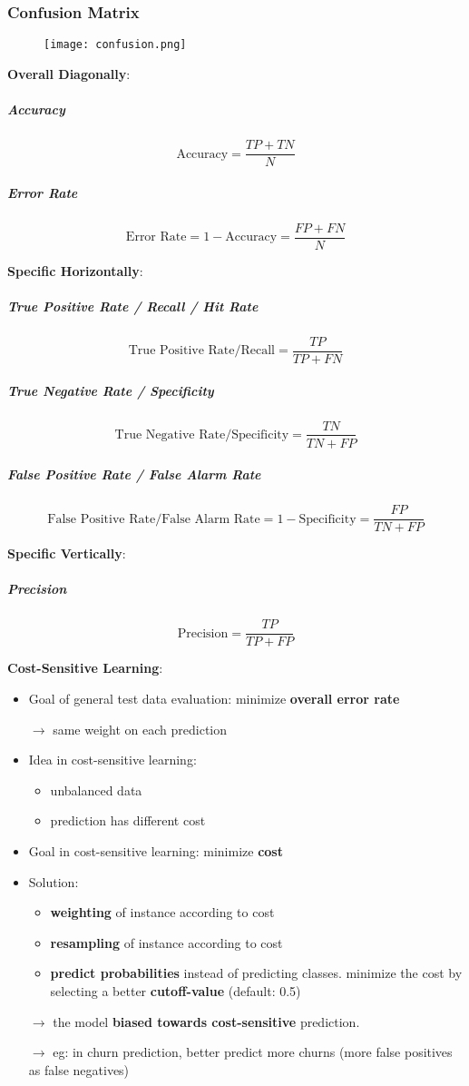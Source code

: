 \subsubsection{Confusion Matrix}
\begin{figure}[H]
	\centering
	\texttt{[image: confusion.png]}
\end{figure}
\textbf{Overall Diagonally}:
\subparagraph{Accuracy} $$\text{Accuracy} = \frac{TP + TN}{N}$$
\subparagraph{Error Rate} $$\text{Error Rate} = 1 - \text{Accuracy} = \frac{FP + FN}{N}$$

\textbf{Specific Horizontally}:
\subparagraph{True Positive Rate / Recall / Hit Rate} $$\text{True Positive Rate/Recall} = \frac{TP}{TP + FN}$$
\subparagraph{True Negative Rate / Specificity} $$\text{True Negative Rate/Specificity} = \frac{TN}{TN + FP}$$
\subparagraph{False Positive Rate / False Alarm Rate} $$\text{False Positive Rate/False Alarm Rate} = 1- \text{Specificity} = \frac{FP}{TN + FP}$$

\textbf{Specific Vertically}:
\subparagraph{Precision} $$\text{Precision} = \frac{TP}{TP + FP}$$


\textbf{Cost-Sensitive Learning}:
\begin{itemize}
	\item Goal of general test data evaluation: minimize \textbf{overall error rate}
	
	$\rightarrow$ same weight on each prediction
	
	\item Idea in cost-sensitive learning: 
	\begin{itemize}
		\item unbalanced data
		\item prediction has different cost
	\end{itemize}
	\item Goal in cost-sensitive learning: minimize \textbf{cost}
	\item Solution:
	\begin{itemize}
		\item \textbf{weighting} of instance according to cost
		\item \textbf{resampling} of instance according to cost
		\item \textbf{predict probabilities} instead of predicting classes. minimize the cost by selecting a better \textbf{cutoff-value} (default: 0.5)
	\end{itemize}
	$\rightarrow$ the model \textbf{biased towards cost-sensitive} prediction. 
	
	$\rightarrow$ eg: in churn prediction, better predict more churns (more false positives as false negatives)
\end{itemize}


